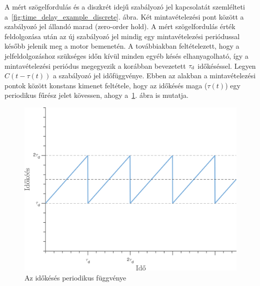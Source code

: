 A mért szögelfordulás és a diszkrét idejű szabályozó jel kapcsolatát szemlélteti a~\ref{fig:time_delay_example_discrete}. ábra.
Két mintavételezési pont között a szabályozó jel állandó marad (zero-order hold). A mért szögelfordulás érték 
feldolgozása után az új szabályozó jel mindig egy mintavételezési periódussal később jelenik meg a motor bemenetén.
A továbbiakban feltételezett, hogy a jelfeldolgozáshoz szükséges időn kívül minden egyéb késés elhanyagolható, 
így a mintavételezési periódus megegyezik a korábban bevezetett \(\tau_{\mathrm{d}}\) időkéséssel. Legyen \(C(t-\tau(t))\) 
a szabályozó jel időfüggvénye. Ebben az alakban a mintavételezési pontok között konstans kimenet feltétele, hogy 
az időkésés maga (\(\tau(t)\)) egy periodikus fűrész jelet kövessen, ahogy a~\ref{fig:time_delay_example_zoh}. ábra is mutatja.

\begin{figure}[ht]
    \begin{center}
    \includegraphics[width=12cm]{images/delay_zoh_example_discrete.png}
    \caption{Az időkésés periodikus függvénye}\label{fig:time_delay_example_zoh}
    \end{center}
\end{figure}


